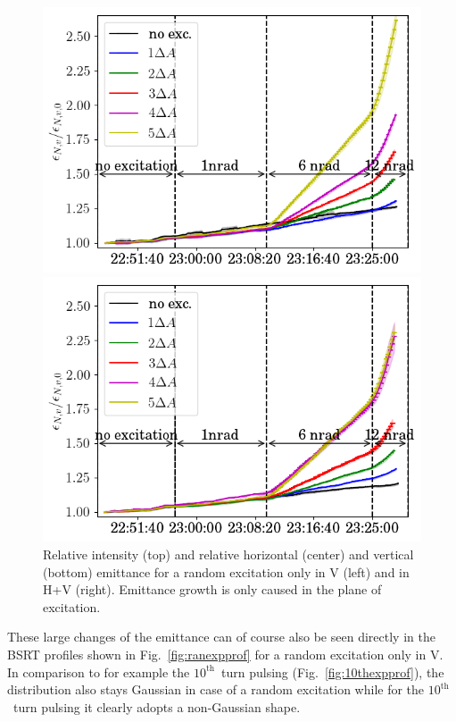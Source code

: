\documentclass[%
 reprint,
 amsmath,amssymb,
 aps,
prstab,
]{revtex4-1}
\begin{document}
\begin{figure}[h]
\begin{minipage}[t]{0.49\linewidth}
		\includegraphics[width=1.0\linewidth]{2017_emitv_avg_rel_vran_no_damper.png}
	\end{minipage}	
	\begin{minipage}[t]{0.49\linewidth}
		\centering
		\includegraphics[width=1.0\linewidth]{2017_emitv_avg_rel_hvran_no_damper.png}
	\end{minipage}	
	\caption{\label{fig:ranexp} Relative intensity (top) and relative horizontal (center) and vertical (bottom) emittance for a random excitation only in V (left) and in H+V (right). Emittance growth is only caused in the plane of excitation.}
\end{figure}
These large changes of the emittance can of course also be seen directly in the BSRT profiles shown in Fig.~\ref{fig:ranexpprof} for a random excitation only in V. In comparison to for example the $10^{\mathrm{th}}$~turn pulsing (Fig.~\ref{fig:10thexpprof}), the distribution also stays Gaussian in case of a random excitation while for the $10^{\mathrm{th}}$~turn pulsing it clearly adopts a non-Gaussian shape.
\end{document}
